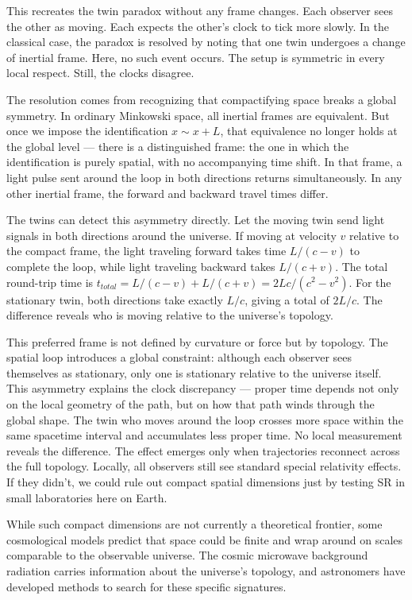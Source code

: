 This recreates the twin paradox without any frame changes. Each observer sees the other as moving. Each expects the other's clock to tick more slowly. In the classical case, the paradox is resolved by noting that one twin undergoes a change of inertial frame. Here, no such event occurs. The setup is symmetric in every local respect. Still, the clocks disagree.

The resolution comes from recognizing that compactifying space breaks a global symmetry. In ordinary Minkowski space, all inertial frames are equivalent. But once we impose the identification $x \sim x + L$, that equivalence no longer holds at the global level — there is a distinguished frame: the one in which the identification is purely spatial, with no accompanying time shift. In that frame, a light pulse sent around the loop in both directions returns simultaneously. In any other inertial frame, the forward and backward travel times differ.

The twins can detect this asymmetry directly. Let the moving twin send light signals in both directions around the universe. If moving at velocity $v$ relative to the compact frame, the light traveling forward takes time $L/(c-v)$ to complete the loop, while light traveling backward takes $L/(c+v)$. The total round-trip time is $t_{total} = L/(c-v) + L/(c+v) = 2Lc/(c^2-v^2)$. For the stationary twin, both directions take exactly $L/c$, giving a total of $2L/c$. The difference reveals who is moving relative to the universe's topology.

This preferred frame is not defined by curvature or force but by topology. The spatial loop introduces a global constraint: although each observer sees themselves as stationary, only one is stationary relative to the universe itself. This asymmetry explains the clock discrepancy — proper time depends not only on the local geometry of the path, but on how that path winds through the global shape. The twin who moves around the loop crosses more space within the same spacetime interval and accumulates less proper time. No local measurement reveals the difference. The effect emerges only when trajectories reconnect across the full topology. Locally, all observers still see standard special relativity effects. If they didn't, we could rule out compact spatial dimensions just by testing SR in small laboratories here on Earth.

While such compact dimensions are not currently a theoretical frontier, some cosmological models predict that space could be finite and wrap around on scales comparable to the observable universe. The cosmic microwave background radiation carries information about the universe's topology, and astronomers have developed methods to search for these specific signatures.


